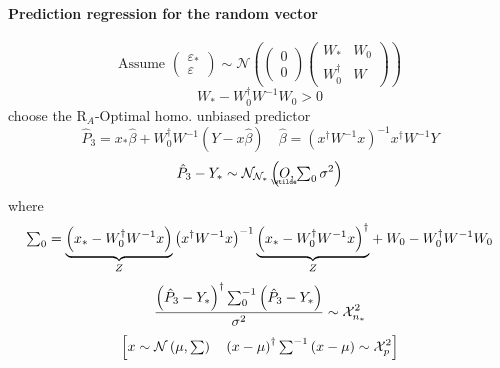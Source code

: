 \documentclass{article}
\begin{document}
\bigskip

\paragraph{Prediction regression for the random vector}

\begin{equation*}
\text{Assume }\left( 
\begin{array}{c}
\varepsilon _{\ast } \\ 
\varepsilon 
\end{array}%
\right) \sim \mathcal{N}\left( \left( 
\begin{array}{c}
0 \\ 
0%
\end{array}%
\right) \left( 
\begin{array}{cc}
W_{\ast } & W_{0} \\ 
W_{0}^{\dagger } & W%
\end{array}%
\right) \right) 
\end{equation*}%
\begin{equation*}
W_{\ast }-W_{0}^{\dagger }W^{-1}W_{0}>0
\end{equation*}%
choose the R$_{A}$-Optimal homo. unbiased predictor%
\begin{equation*}
\hat{P}_{3}=x_{\ast }\hat{\beta}+W_{0}^{\dagger }W^{-1}\left( Y-x\hat{\beta}%
\right) \quad \hat{\beta}=\left( x^{\dagger }W^{-1}x\right) ^{-1}x^{\dagger
}W^{-1}Y
\end{equation*}%
\begin{equation*}
\hat{P}_{3}-Y_{\ast }\sim \mathcal{N}_{\mathcal{N}_{\ast }}\left( 
\underaccent{\wtilde}{O}%
,\tsum\nolimits_{0}\sigma ^{2}\right) 
\end{equation*}%
where%
\begin{equation*}
\tsum\nolimits_{0}=\underset{Z}{\underbrace{\left( x_{\ast }-W_{0}^{\dagger
}W^{-1}x\right) }}\left( x^{\dagger }W^{-1}x\right) ^{-1}\underset{Z}{%
\underbrace{\left( x_{\ast }-W_{0}^{\dagger }W^{-1}x\right) ^{\dagger }}}%
+W_{0}-W_{0}^{\dagger }W^{-1}W_{0}
\end{equation*}%
\begin{equation*}
\frac{\left( \hat{P}_{3}-Y_{\ast }\right) ^{\dagger
}\tsum\nolimits_{0}^{-1}\left( \hat{P}_{3}-Y_{\ast }\right) }{\sigma ^{2}}%
\sim \mathcal{X}_{n_{\ast }}^{2}
\end{equation*}%
\begin{equation*}
\left[ x\sim \mathcal{N}\left( \mu ,\tsum \right) \quad \left( x-\mu \right)
^{\dagger }\tsum\nolimits^{-1}\left( x-\mu \right) \sim \mathcal{X}_{p}^{2}%
\right] 
\end{equation*}
\end{document}
